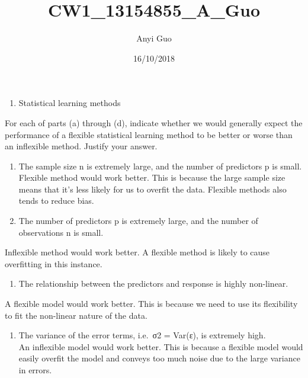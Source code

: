 \documentclass[]{article}
\title{CW1\_13154855\_A\_Guo}
\author{Anyi Guo}
\date{16/10/2018}
\providecommand{\tightlist}{%
  \setlength{\itemsep}{0pt}\setlength{\parskip}{0pt}}
\begin{document}
\maketitle

\begin{enumerate}
\def\labelenumi{\arabic{enumi}.}
\tightlist
\item
  Statistical learning methods
\end{enumerate}

For each of parts (a) through (d), indicate whether we would generally
expect the performance of a flexible statistical learning method to be
better or worse than an inflexible method. Justify your answer.

\begin{enumerate}
\def\labelenumi{(\alph{enumi})}
\item
  The sample size n is extremely large, and the number of predictors p
  is small.\\
  Flexible method would work better. This is because the large sample
  size means that it's less likely for us to overfit the data. Flexible
  methods also tends to reduce bias.
\item
  The number of predictors p is extremely large, and the number of
  observations n is small.
\end{enumerate}

Inflexible method would work better. A flexible method is likely to
cause overfitting in this instance.

\begin{enumerate}
\def\labelenumi{(\alph{enumi})}
\setcounter{enumi}{2}
\tightlist
\item
  The relationship between the predictors and response is highly
  non-linear.
\end{enumerate}

A flexible model would work better. This is because we need to use its
flexibility to fit the non-linear nature of the data.

\begin{enumerate}
\def\labelenumi{(\alph{enumi})}
\setcounter{enumi}{3}
\tightlist
\item
  The variance of the error terms, i.e.~σ2 = Var(ε), is extremely
  high.\\
  An inflexible model would work better. This is because a flexible
  model would easily overfit the model and conveys too much noise due to
  the large variance in errors.
\end{enumerate}
\end{document}

